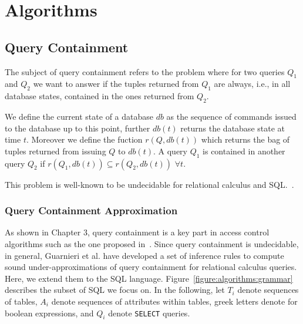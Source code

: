 \section{Algorithms}


\subsection{Query Containment}

The subject of query containment refers to the problem where for two queries $Q_1$ and $Q_2$ we want to answer if the tuples returned from $Q_1$ are always, i.e., in all database states, contained in the ones returned from $Q_2$.

We define the current state of a database $db$ as the sequence of commands issued to the database up to this point, further $db(t)$ returns the database state at time $t$.
%
Moreover we define the fuction $r(Q, db(t))$ which returns the bag of tuples returned from issuing $Q$ to $db(t)$.
%
A query $Q_1$ is contained in another query $Q_2$ if $r(Q_1, db(t)) \subseteq r(Q_2, db(t))$ $\forall t$.

This problem is well-known to be undecidable for relational calculus and SQL.~\cite{abiteboul1995foundations}.

\subsubsection{Query Containment Approximation}

As shown in Chapter 3, query containment is a key part in access control algorithms such as the one proposed in~\cite{guarnieri2016strong}.
Since query containment is undecidable, in general, Guarnieri et al. have developed a set of inference rules to compute sound under-approximations of query containment for relational calculus queries.
%
Here, we extend them to the SQL language.
%
Figure~\ref{figure:algorithms:grammar} describes the subset of SQL we focus on. 
%
In the following, let $T_i$ denote sequences of tables, $A_i$ denote sequences of attributes within tables, greek letters denote for boolean expressions, and $Q_i$ denote \texttt{SELECT} queries.


